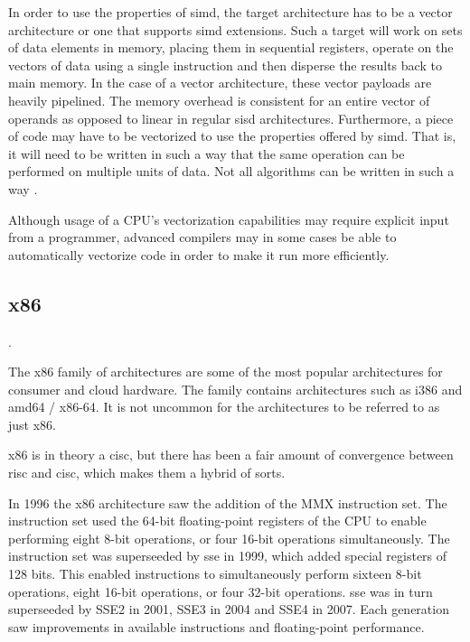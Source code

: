 In order to use the properties of \gls{simd}, the target architecture has to be a vector architecture or one that supports \gls{simd} extensions. Such a target will work on sets of data elements in memory, placing them in sequential registers, operate on the vectors of data using a single instruction and then disperse the results back to main memory. In the case of a vector architecture, these vector payloads are heavily pipelined. The memory overhead is consistent for an entire vector of operands as opposed to linear in regular \gls{sisd} architectures\cite{hennessy2011:vectorization}. Furthermore, a piece of code may have to be vectorized to use the properties offered by \gls{simd}. That is, it will need to be written in such a way that the same operation can be performed on multiple units of data. Not all algorithms can be written in such a way \cite{dickson2011}.

Although usage of a CPU's vectorization capabilities may require explicit input from a programmer, advanced compilers may in some cases be able to automatically vectorize code in order to make it run more efficiently\cite{dickson2011}.

\subsection{x86}

.


The \gls{x86} family of architectures are some of the most popular architectures for consumer and cloud hardware. The family contains architectures such as i386 and amd64 / x86-64. It is not uncommon for the architectures to be referred to as just \gls{x86}\cite{carter2002}.

\gls{x86} is in theory a \gls{cisc}, but there has been a fair amount of convergence between \gls{risc} and \gls{cisc}, which makes them a hybrid of sorts\cite{carter2002}.

In 1996 the x86 architecture saw the addition of the MMX instruction set. The instruction set used the 64-bit floating-point registers of the CPU to enable performing eight 8-bit operations, or four 16-bit operations simultaneously. The instruction set was superseeded by \gls{sse} in 1999, which added special registers of 128 bits. This enabled instructions to simultaneously perform sixteen 8-bit operations, eight 16-bit operations, or four 32-bit operations. \gls{sse} was in turn superseeded by SSE2 in 2001, SSE3 in 2004 and SSE4 in 2007. Each generation saw improvements in available instructions and floating-point performance\cite{hennessy2011:avx}.

